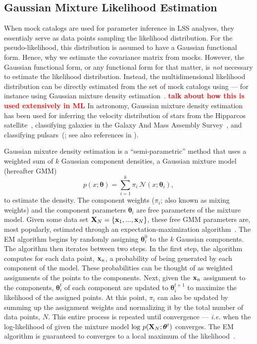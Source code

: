 \documentclass[12pt, letterpaper, preprint]{aastex}
\newcommand{\beq}{\begin{equation}}
\newcommand{\eeq}{\end{equation}}
\newcommand{\todo}[1]{{\bf \textcolor{red}{#1}}}
\begin{document}
\subsection{Gaussian Mixture Likelihood Estimation} \label{sec:gmm}
When mock catalogs are used for parameter inference in LSS analyses, 
they essentialy serve as data points sampling the likelihood distribution. 
For the pseudo-likelihood, this distribution is assumed to have a 
Gaussian functional form. Hence, why we estimate the covariance matrix 
from mocks. However, the Gaussian functional form, or any functional form for 
that matter, is \emph{not} necessary to estimate the likelihood distribution. 
Instead, the multidimensional likelihood distribution 
can be directly estimated from the set of mock catalogs using --- for 
instance using Gaussian mixture density estimation~\citep{9780471006268}. 
\todo{talk about how this is used extensively in ML} 
In astronomy, Gaussian mixture density estimation has been used for 
inferring the velocity distribution of stars from the Hipparcos 
satellite~\citep{bovy2011}, classifying galaxies in the Galaxy And Mass Assembly 
Survey~\citep{taylor2015}, and classifying pulsars~(\citealt{lee2012}; see
also references in \citealt{kuhn2017}). 

Gaussian mixutre density estimation is a ``semi-parametric'' method 
that uses a weighted sum of $k$ Gaussian component densities, a Gaussian 
mixture model (hereafter GMM)
\beq
p(x; \bm{\theta}) = \sum\limits_{i=1}^{k} \pi_i\, \mathcal{N}(x; \bm{\theta}_i),
\eeq
to estimate the density. 
The component weights ($\pi_i$; also known as mixing weights) and the 
component parameters $\bm{\theta}_i$ are free parameters of the mixture 
model. Given some data set ${\bf X}_N = \{{\bf x}_1,..., {\bf x}_N \}$, 
these free GMM parameters are, most popularly, estimated 
through an expectation-maximization algorithm~\citep[EM;][]{dempster1977, neal1998}.
The EM algorithm begins by randomly assigning $\bm{\theta}^0_i$ to the 
$k$ Gaussian components. The algorithm then iterates between two steps. 
In the first step, the algorithm computes for each data point, ${\bf x}_n$, 
a probability of being generated by each component of the model. These 
probabilities can be thought of as weighted assignments of the points 
to the components. Next, given the ${\bf x}_n$ assignment to the 
components, $\bm{\theta}^t_i$ of each component are updated to $\bm{\theta}^{t+1}_i$
to maximize the likelihood of the assigned points. At this point, $\pi_i$ 
can also be updated by summing up the assignment weights and 
normalizing it by the total number of data points, $N$. This entire
process is repeated until convergence --- \emph{i.e.} when the log-likelihood of 
given the mixture model $\log\,p({\bf X}_N; \bm{\theta}^t)$ %
converges. The EM algorithm is guaranteed to converges to a local maximum 
of the likelihood~\citep{wu1983}. 
\end{document}
